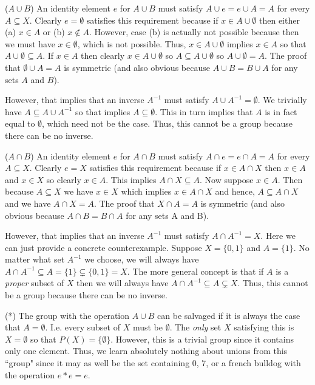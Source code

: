 \documentclass[12pt]{article}
\numberwithin{theorem}{section}
\numberwithin{equation}{section}
\numberwithin{remark}{section}
\numberwithin{definition}{section}
\numberwithin{theorem}{section}
\numberwithin{lemma}{section}
\numberwithin{example}{section}
\begin{document}
\noindent ($A\cup B$) An identity element $e$ for $A\cup B$ must satisfy $A\cup e = e \cup A = A$ for every $A\subseteq X$. Clearly $e=\emptyset$ satisfies this requirement because if $x\in A\cup\emptyset$ then either (a) $x\in A$ or (b) $x\notin A$. However, case (b) is actually not possible because then we must have $x\in\emptyset$, which is not possible. Thus, $x\in A\cup\emptyset$ implies $x\in A$ so that $A\cup\emptyset \subseteq A$. If $x\in A$ then clearly $x\in A\cup\emptyset$ so $A\subseteq A\cup\emptyset$ so $A\cup\emptyset = A$. The proof that $\emptyset\cup A = A$ is symmetric (and also obvious because $A\cup B = B \cup A$ for any sets $A$ and $B$). 

However, that implies that an inverse $A^{-1}$ must satisfy $A\cup A^{-1} = \emptyset$. We trivially have $A\subseteq A \cup A^{-1}$ so that implies $A\subseteq \emptyset$. This in turn implies that $A$ is in fact equal to $\emptyset$, which need not be the case. Thus, this cannot be a group because there can be no inverse. 

\vspace{\baselineskip}

\noindent ($A\cap B$) An identity element $e$ for $A\cap B$ must satisfy $A\cap e = e \cap A = A$ for every $A\subseteq X$. Clearly $e=X$ satisfies this requirement because if $x\in A \cap X$ then $x\in A$ and $x\in X$ so clearly $x\in A$. This implies $A \cap X \subseteq A$. Now suppose $x\in A$. Then because $A\subseteq X$ we have $x\in X$ which implies $x\in A\cap X$ and hence, $A\subseteq A \cap X$ and we have $A\cap X = A$. The proof that $X\cap A = A$ is symmetric (and also obvious because $A\cap B=B\cap A$ for any sets A and B). 

However, that implies that an inverse $A^{-1}$ must satisfy $A\cap A^{-1} = X$. Here we can just provide a concrete counterexample. Suppose $X=\{0,1\}$ and $A=\{1\}$. No matter what set $A^{-1}$ we choose, we will always have $A\cap A^{-1}\subseteq A = \{1\}\subsetneq \{0,1\}=X$. The more general concept is that if $A$ is a \emph{proper} subset of $X$ then we will always have $A\cap A^{-1} \subseteq A \subsetneq X$. Thus, this cannot be a group because there can be no inverse. 

\vspace{\baselineskip}

\noindent (*) The group with the operation $A\cup B$ can be salvaged if it is always the case that $A=\emptyset$. I.e. every subset of $X$ must be $\emptyset$. The \emph{only} set $X$ satisfying this is $X=\emptyset$ so that $P(X)=\{\emptyset\}$. However, this is a trivial group since it contains only one element. Thus, we learn absolutely nothing about unions from this ``group" since it may as well be the set containing $0$, $7$, or a french bulldog with the operation $e*e=e$. 
\end{document}
